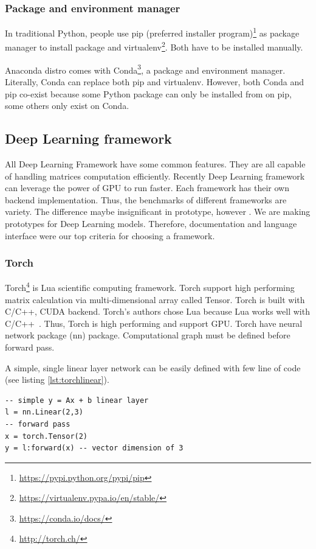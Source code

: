 \subsubsection{Package and environment manager}
In traditional Python, people use pip (preferred installer program)\footnote{\url{https://pypi.python.org/pypi/pip}} as package manager to install package and virtualenv\footnote{\url{https://virtualenv.pypa.io/en/stable/}}. Both have to be installed manually.

Anaconda distro comes with Conda\footnote{\url{https://conda.io/docs/}}, a package and environment manager.
Literally, Conda can replace both pip and virtualenv.
However, both Conda and pip co-exist because some Python package can only be installed from on pip, some others only exist on Conda.


\subsection{Deep Learning framework}
All Deep Learning Framework have some common features.
They are all capable of handling matrices computation efficiently.
Recently Deep Learning framework can leverage the power of GPU to run faster.
Each framework has their own backend implementation.
Thus, the benchmarks of different frameworks are variety.
The difference maybe insignificant in prototype, however .
We are making prototypes for Deep Learning models.
Therefore, documentation and language interface were our top criteria for choosing a framework.

\subsubsection{Torch}\label{sec:torch}
Torch\footnote{\url{http://torch.ch/}} is Lua scientific computing framework.
Torch support high performing matrix calculation via multi-dimensional array called Tensor. Torch is built with C/C++, CUDA backend.
Torch's authors chose Lua because Lua works well with C/C++~\cite{collobert2011torch7}.  Thus, Torch is high performing and support GPU. Torch have neural network package (nn) package. Computational graph must be defined before forward pass.

A simple, single linear layer network can be easily defined with few line of code (see listing \ref{lst:torchlinear}).

\begin{lstlisting}[caption={Simple linear layer in Torch},label={lst:torchlinear}, language={[5.1]Lua}]
-- simple y = Ax + b linear layer
l = nn.Linear(2,3)
-- forward pass
x = torch.Tensor(2)
y = l:forward(x) -- vector dimension of 3
\end{lstlisting}

